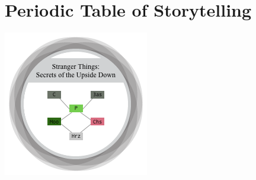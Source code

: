 
\section{Periodic Table of Storytelling }


\begin{center}

	\includegraphics[width=0.75\linewidth]{images/story_molecolar.png}

\end{center}

\vspace*{2mm}

